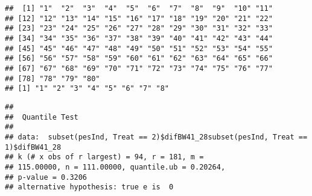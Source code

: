 \documentclass[11pt,a4paper]{article}\usepackage[]{graphicx}\usepackage[]{color}
\makeatletter
\newenvironment{kframe}{%
 \def\at@end@of@kframe{}%
 \ifinner\ifhmode%
  \def\at@end@of@kframe{\end{minipage}}%
  \begin{minipage}{\columnwidth}%
 \fi\fi%
 \def\FrameCommand##1{\hskip\@totalleftmargin \hskip-\fboxsep
 \colorbox{shadecolor}{##1}\hskip-\fboxsep
     \hskip-\linewidth \hskip-\@totalleftmargin \hskip\columnwidth}%
 \MakeFramed {\advance\hsize-\width
   \@totalleftmargin\z@ \linewidth\hsize
   \@setminipage}}%
 {\par\unskip\endMakeFramed%
 \at@end@of@kframe}
\newenvironment{knitrout}{}{} %
\makeatother
\begin{document}
\begin{knitrout}
\color{fgcolor}\begin{kframe}
\begin{verbatim}
##  [1] "1"  "2"  "3"  "4"  "5"  "6"  "7"  "8"  "9"  "10" "11"
## [12] "12" "13" "14" "15" "16" "17" "18" "19" "20" "21" "22"
## [23] "23" "24" "25" "26" "27" "28" "29" "30" "31" "32" "33"
## [34] "34" "35" "36" "37" "38" "39" "40" "41" "42" "43" "44"
## [45] "45" "46" "47" "48" "49" "50" "51" "52" "53" "54" "55"
## [56] "56" "57" "58" "59" "60" "61" "62" "63" "64" "65" "66"
## [67] "67" "68" "69" "70" "71" "72" "73" "74" "75" "76" "77"
## [78] "78" "79" "80"
## [1] "1" "2" "3" "4" "5" "6" "7" "8"
\end{verbatim}
\end{kframe}
\end{knitrout}



\begin{knitrout}
\color{fgcolor}\begin{kframe}
\begin{verbatim}
## 
## 	Quantile Test
## 
## data:  subset(pesInd, Treat == 2)$difBW41_28subset(pesInd, Treat == 1)$difBW41_28
## k (# x obs of r largest) = 94, r = 181, m =
## 115.00000, n = 111.00000, quantile.ub = 0.20264,
## p-value = 0.3206
## alternative hypothesis: true e is  0
\end{verbatim}
\end{kframe}
\end{knitrout}
\end{document}
